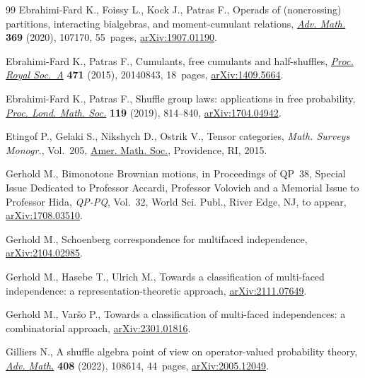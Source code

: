 \documentclass[pdftex]{sigma}
\numberwithin{equation}{section}
\begin{document}
\begin{thebibliography}{99}
Ebrahimi-Fard K., Foissy L., Kock J., Patras F., Operads of (noncrossing)
 partitions, interacting bialgebras, and moment-cumulant relations,
 \href{https://doi.org/10.1016/j.aim.2020.107170}{\textit{Adv. Math.}} \textbf{369} (2020), 107170, 55~pages,
 \href{https://arxiv.org/abs/1907.01190}{arXiv:1907.01190}.

Ebrahimi-Fard K., Patras F., Cumulants, free cumulants and half-shuffles,
 \href{https://doi.org/10.1098/rspa.2014.0843}{\textit{Proc. Royal Soc.~A}} \textbf{471} (2015), 20140843, 18~pages,
 \href{https://arxiv.org/abs/1409.5664}{arXiv:1409.5664}.

Ebrahimi-Fard K., Patras F., Shuffle group laws: applications in free
 probability, \href{https://doi.org/10.1112/plms.12249}{\textit{Proc. Lond. Math. Soc.}} \textbf{119} (2019), 814--840,
 \href{https://arxiv.org/abs/1704.04942}{arXiv:1704.04942}.

Etingof P., Gelaki S., Nikshych D., Ostrik V., Tensor categories, \textit{Math.
 Surveys Monogr.}, Vol.~205, \href{https://doi.org/10.1090/surv/205}{Amer. Math. Soc.}, Providence, RI, 2015.

Gerhold M., Bimonotone {B}rownian motions, in Proceedings of QP~38, Special
 Issue Dedicated to Professor Accardi, Professor Volovich and a Memorial Issue
 to Professor Hida, \textit{QP-PQ}, Vol.~32, World Sci. Publ., River Edge, NJ,
 {t}o appear, \href{https://arxiv.org/abs/1708.03510}{arXiv:1708.03510}.

Gerhold M., Schoenberg correspondence for multifaced independence,
 \href{https://arxiv.org/abs/2104.02985}{arXiv:2104.02985}.

Gerhold M., Hasebe T., Ulrich M., Towards a classification of multi-faced
 independence: a representation-theoretic approach, \href{https://arxiv.org/abs/2111.07649}{arXiv:2111.07649}.

Gerhold M., Var\v{s}o P., Towards a classification of multi-faced
 independences: a combinatorial approach, \href{https://arxiv.org/abs/2301.01816}{arXiv:2301.01816}.

Gilliers N., A shuffle algebra point of view on operator-valued probability
 theory, \href{https://doi.org/10.1016/j.aim.2022.108614}{\textit{Adv. Math.}} \textbf{408} (2022), 108614, 44~pages,
 \href{https://arxiv.org/abs/2005.12049}{arXiv:2005.12049}.


\end{thebibliography}
\end{document}
